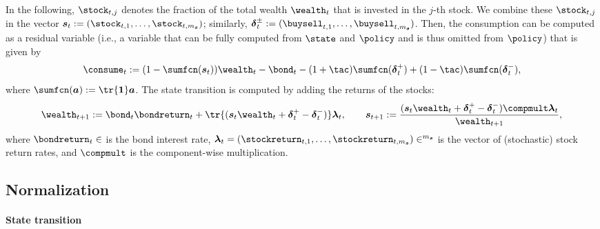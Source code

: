 In the following,
$\stock_{t,j}$ denotes the fraction of the total wealth $\wealth_t$
that is invested in the $j$-th stock.
We combine these  $\stock_{t,j}$
in the vector $\vstock_t := (\stock_{t,1}, \dotsc, \stock_{t,m_{\vstock}})$;
similarly, $\vbuysell_t := (\buysell_{t,1}, \dotsc, \buysell_{t,m_{\vstock}})$.
Then, the consumption can be computed as a residual variable
(i.e., a variable that can be fully computed from $\state$ and $\policy$
and is thus omitted from $\policy$)
that is given by
\begin{equation}
  \consume_t
  := (1 - \sumfcn(\vstock_t)) \wealth_t - \bond_t -
  (1 + \tac) \sumfcn(\vbuy_t) + (1 - \tac) \sumfcn(\vsell_t),
\end{equation}
where $\sumfcn(\*a) := \tr{\*1} \*a$.
The state transition is computed by adding the returns of the stocks:%
\begin{equation}
  \wealth_{t+1}
  := \bond_t \bondreturn_t +
  \tr{(\vstock_t \wealth_t + \vbuy_t - \vsell_t)} \vstockreturn_t,\qquad
  \vstock_{t+1}
  := \frac{
    (\vstock_t \wealth_t + \vbuy_t - \vsell_t) \compmult \vstockreturn_t
  }{\wealth_{t+1}},
\end{equation}
where $\bondreturn_t \in \real$ is the bond interest rate,
$
  \vstockreturn_t
  = (\stockreturn_{t,1}, \dotsc, \stockreturn_{t,m_{\vstock}})
  \in \real^{m_{\vstock}}
$
is the vector of (stochastic) stock return rates, and
$\compmult$ is the component-wise multiplication.



\subsection{Normalization}
\label{sec:832normalized}

\paragraph{State transition}

